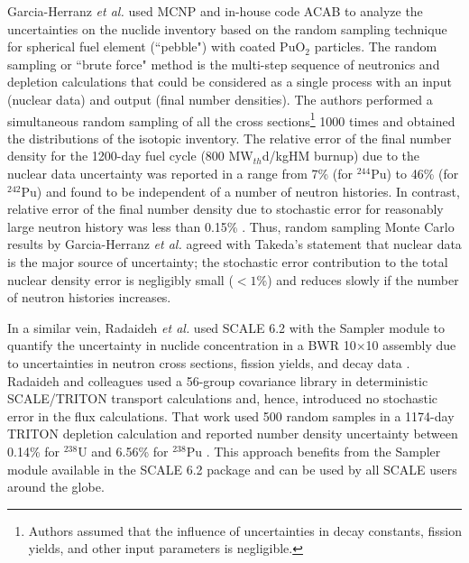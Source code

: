 Garcia-Herranz \emph{et al.} \cite{garcia-herranz_propagation_2008} used MCNP 
and in-house code ACAB to analyze the uncertainties on the nuclide inventory 
based on the random sampling technique for spherical fuel element (``pebble") 
with coated PuO$_2$ particles. The random sampling or ``brute force" method is 
the multi-step sequence of neutronics and depletion calculations that could be 
considered as a single process with an input (nuclear data) and output (final 
number densities). The authors performed a simultaneous random sampling of all 
the cross sections\footnote{Authors assumed that the influence of 
uncertainties in decay constants, fission yields, and other input parameters 
is negligible.} 1000 times and obtained the distributions of the isotopic 
inventory. The relative error of the final number density for the 1200-day 
fuel cycle (800 MW$_{th}$d/kgHM burnup) due to the nuclear data uncertainty 
was reported in a range from 7\% (for $^{244}$Pu) to 46\% (for $^{242}$Pu) and 
found to be independent of a number of neutron histories. 
In contrast, relative error of the final number density due to stochastic 
error for reasonably large neutron history was less than 0.15\% 
\cite{garcia-herranz_propagation_2008}. Thus, random sampling Monte Carlo 
results by Garcia-Herranz \emph{et al.} agreed with Takeda's statement that 
nuclear data is the major source of uncertainty; the stochastic error 
contribution to the total nuclear density error is negligibly small ($<1$\%) 
and reduces slowly if the number of neutron histories increases.

In a similar vein, Radaideh \emph{et al.} used SCALE 6.2 with the Sampler 
module \cite{rearden_scale_2018} to quantify the uncertainty in nuclide 
concentration in a \gls{BWR} 10$\times$10 assembly due to uncertainties in 
neutron cross sections, fission yields, and decay data 
\cite{radaideh_using_2019}. Radaideh and colleagues used a 56-group covariance 
library in deterministic SCALE/TRITON transport calculations and, hence, 
introduced no stochastic error in the flux calculations. That work used 500 
random samples in a 1174-day TRITON depletion calculation and reported number 
density uncertainty between 0.14\% for $^{238}$U and 6.56\% for $^{238}$Pu 
\cite{radaideh_combining_2019}. This approach benefits from the Sampler module 
available in the SCALE 6.2 package and can be used by all SCALE users around 
the globe.

